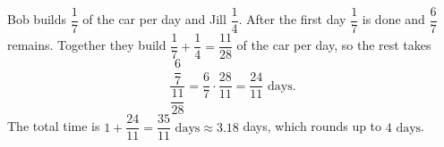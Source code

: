 Bob builds $\dfrac17$ of the car per day and Jill $\dfrac14$. After the first day $\dfrac17$ is done and $\dfrac67$ remains. Together they build $\dfrac17+\dfrac14=\dfrac{11}{28}$ of the car per day, so the rest takes
\[\dfrac{\dfrac67}{\dfrac{11}{28}}=\dfrac67\cdot\dfrac{28}{11}=\dfrac{24}{11}\text{ days}.\]
The total time is $1+\dfrac{24}{11}=\boxed{\dfrac{35}{11}\text{ days}}\approx3.18$ days, which rounds up to $\boxed{4\text{ days}}$.
